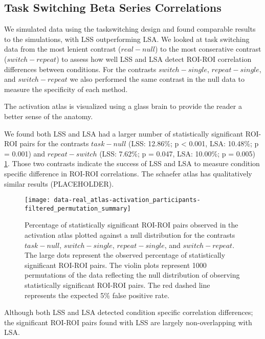 \documentclass[10pt,letterpaper]{article}
\begin{document}
\subsection*{Task Switching Beta Series Correlations}
\label{results:bsc-taskswitch}

We simulated data using the taskswitching design and found comparable
results to the simulations, with LSS outperforming LSA.
We looked at task switching data from the most lenient
contrast ($real - null$) to the most conserative contrast ($switch - repeat$)
to assess how well LSS and LSA detect ROI-ROI correlation differences between conditions.
For the contrasts $switch - single$, $repeat - single$, and $switch - repeat$ we also
performed the same contrast in the null data to measure the specificity of each method.

The activation atlas is visualized using a glass brain to provide the reader a better sense
of the anatomy.

We found both LSS and LSA had a larger number of statistically significant ROI-ROI pairs
for the contrasts $task - null$ (LSS: 12.86\%; p < 0.001, LSA: 10.48\%; p = 0.001)
and $repeat - switch$ (LSS: 7.62\%; p = 0.047, LSA: 10.00\%; p = 0.005) \ref{fig:main-result}.
Those two contrasts indicate the success of LSS and LSA to measure
condition specific difference in ROI-ROI correlations.
The schaefer atlas has qualitatively similar results (PLACEHOLDER).


\begin{figure}[H]
  \texttt{[image: data-real\_atlas-activation\_participants-filtered\_permutation\_summary]}
  \caption{
    Percentage of statistically significant ROI-ROI pairs observed in the activation atlas
    plotted against a null distribution for the contrasts $task - null$, $switch - single$,
    $repeat - single$, and $switch - repeat$.
    The large dots represent the observed percentage of statistically significant ROI-ROI pairs.
    The violin plots represent 1000 permutations of the data reflecting the null distribution
    of observing statistically significant ROI-ROI pairs.
    The red dashed line represents the expected 5\% false positive rate.
  }
  \label{fig:main-result}
\end{figure}

Although both LSS and LSA detected condition specific correlation differences;
the significant ROI-ROI pairs found with LSS are largely non-overlapping with LSA.
\end{document}
